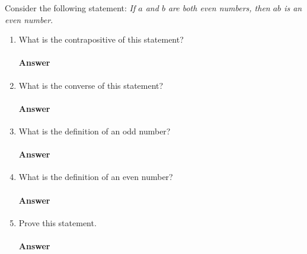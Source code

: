 \documentclass{article}
\begin{document}
\collab{\todo{}}
Consider the following statement: \emph{If $a$ and $b$ are both even numbers, then $ab$ is
an even number}.
\begin{enumerate}
    \item What is the contrapositive of this statement?

        \paragraph{Answer}
        \todo{}

    \item What is the converse of this statement?

        \paragraph{Answer}
        \todo{}

    \item What is the definition of an odd number?

        \paragraph{Answer}
        \todo{}

    \item What is the definition of an even number?

        \paragraph{Answer}
        \todo{}

    \item Prove this statement.

        \paragraph{Answer}
        \todo{}

\end{enumerate}
\end{document}
